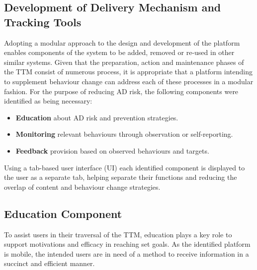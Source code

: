 \subsection{Development of Delivery Mechanism and Tracking Tools}

Adopting a modular approach to the design and development of the platform enables components of the system to be added, removed or re-used in other similar systems. Given that the preparation, action and maintenance phases of the TTM consist of numerous process, it is appropriate that a platform intending to supplement behaviour change can address each of these processes in a modular fashion. For the purpose of reducing AD risk, the following components were identified as being necessary:
\begin{itemize}
\item \textbf{Education} about AD risk and prevention strategies.
\item \textbf{Monitoring} relevant behaviours through observation or self-reporting.
\item \textbf{Feedback} provision based on observed behaviours and targets.
\end{itemize}

Using a tab-based user interface (UI) each identified component is displayed to the user as a separate tab, helping separate their functions and reducing the overlap of content and behaviour change strategies.

\subsection{Education Component}
To assist users in their traversal of the TTM, education plays a key role to support motivations and efficacy in reaching set goals. As the identified platform is mobile, the intended users are in need of a method to receive information in a succinct and efficient manner.

